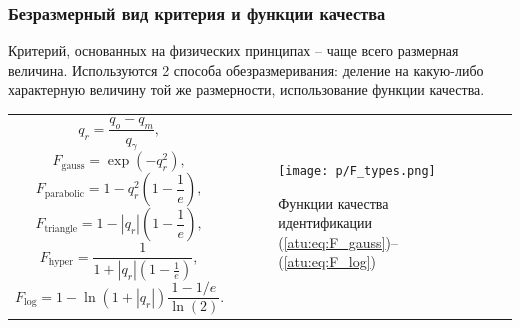 \documentclass[10pt,utf8]{beamer}
\newlength\TW
\begin{document}
%
%
%
%
%
%
%
%
%
%
%





\begin{frame}[fragile]
  \frametitle{Безразмерный вид критерия и функции качества}

  Критерий, основанных на физических принципах -- чаще всего размерная величина.
  Используются 2 способа обезразмеривания: деление
  на какую-либо характерную величину той же размерности,
  использование функции качества.

  \begin{tabular}{p{45\TW}|p{52\TW}}
  \[
      q_r = \frac{q_o - q_m}{q_\gamma},
  \]
  \begin{equation}
    F_{\mathrm{gauss}} = \exp( - q_r^2 ),
  \label{atu:eq:F_gauss}
  \end{equation}
  \begin{equation}
    F_{\mathrm{parabolic}} = 1 - q_r^2 \left( 1 - \frac{1}{e} \right),
  \label{atu:eq:F_parabolic}
  \end{equation}
  \begin{equation}
    F_{\mathrm{triangle}} = 1 - |q_r| \left( 1 - \frac{1}{e} \right),
  \label{atu:eq:F_triangle}
  \end{equation}
  \begin{equation}
    F_{\mathrm{hyper}} = \frac{1}{ 1 + |q_r| \left( 1 - \frac{1}{e} \right)},
  \label{atu:eq:F_hyper}
  \end{equation}
  \begin{equation}
    F_{\mathrm{log}} = 1 - \ln \left( 1 + |q_r| \right) \frac{1-1/e}{\ln(2)}.
  \label{atu:eq:F_log}
  \end{equation}
 &
  \begin{figure}[htb!]
    \centerline{\texttt{[image: p/F\_types.png]} }
    \caption{Функции качества идентификации (\ref{atu:eq:F_gauss})--(\ref{atu:eq:F_log})}
    \label{atu:f:F_types}
  \end{figure}
  \end{tabular}



\end{frame}
\end{document}
